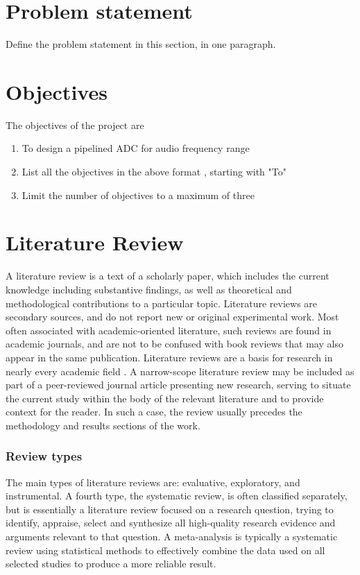 \section[Problem statement]{\textbf{Problem statement}}

Define the problem statement in this section, in one paragraph.

\section[Objectives]{\textbf{Objectives}}
The objectives of the project are
\begin{enumerate}
\item To design a pipelined ADC for audio frequency range
\item List all the objectives in the above format , starting with "To"
\item Limit the number of objectives to a maximum of three
\end{enumerate}

\section[Literature Review]{\textbf{Literature Review}}

A literature review is a text of a scholarly paper, which includes the current knowledge including substantive findings, as well as theoretical and methodological contributions to a particular topic. Literature reviews are secondary sources, and do not report new or original experimental work. Most often associated with academic-oriented literature, such reviews are found in academic journals, and are not to be confused with book reviews that may also appear in the same publication. Literature reviews are a basis for research in nearly every academic field . A narrow-scope literature review may be included as part of a peer-reviewed journal article presenting new research, serving to situate the current study within the body of the relevant literature and to provide context for the reader. In such a case, the review usually precedes the methodology and results sections of the work.


\subsubsection[Review types]{\textbf{Review types}}

The main types of literature reviews are: evaluative, exploratory, and instrumental. A fourth type, the systematic review, is often classified separately, but is essentially a literature review focused on a research question, trying to identify, appraise, select and synthesize all high-quality research evidence and arguments relevant to that question. A meta-analysis is typically a systematic review using statistical methods to effectively combine the data used on all selected studies to produce a more reliable result.


